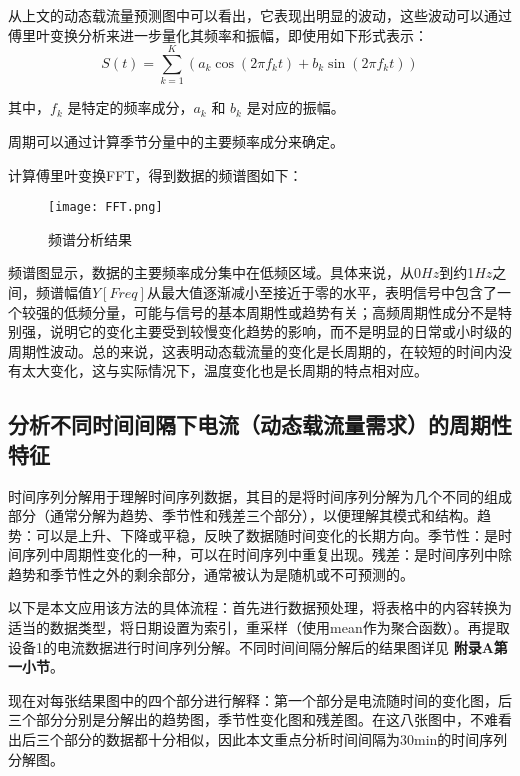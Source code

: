 \documentclass[withoutpreface,bwprint]{cumcmthesis}  %
\begin{document}
        \vspace{12pt}

        从上文的动态载流量预测图中可以看出，它表现出明显的波动，这些波动可以通过傅里叶变换分析来进一步量化其频率和振幅，即使用如下形式表示：
        \begin{equation}
            S(t)=\sum_{k=1}^K\left(a_k \cos \left(2 \pi f_k t\right)+b_k \sin \left(2 \pi f_k t\right)\right)
        \end{equation}

        其中，$f_k$ 是特定的频率成分，$a_k$ 和 $b_k$ 是对应的振幅。
        
        周期可以通过计算季节分量中的主要频率成分来确定。

        计算傅里叶变换FFT，得到数据的频谱图如下：

        \begin{figure}[h!]
		  \centering
		  \texttt{[image: FFT.png]}
		  \caption{频谱分析结果}
	\end{figure}

        频谱图显示，数据的主要频率成分集中在低频区域。具体来说，从0$Hz$到约1$Hz$之间，频谱幅值$Y[Freq]$从最大值逐渐减小至接近于零的水平，表明信号中包含了一个较强的低频分量，可能与信号的基本周期性或趋势有关；高频周期性成分不是特别强，说明它的变化主要受到较慢变化趋势的影响，而不是明显的日常或小时级的周期性波动。总的来说，这表明动态载流量的变化是长周期的，在较短的时间内没有太大变化，这与实际情况下，温度变化也是长周期的特点相对应。


        \subsection {分析不同时间间隔下电流（动态载流量需求）的周期性特征}
        \label{model_1}
        时间序列分解用于理解时间序列数据，其目的是将时间序列分解为几个不同的组成部分（通常分解为趋势、季节性和残差三个部分），以便理解其模式和结构。趋势：可以是上升、下降或平稳，反映了数据随时间变化的长期方向。季节性：是时间序列中周期性变化的一种，可以在时间序列中重复出现。残差：是时间序列中除趋势和季节性之外的剩余部分，通常被认为是随机或不可预测的。

        以下是本文应用该方法的具体流程：首先进行数据预处理，将表格中的内容转换为适当的数据类型，将日期设置为索引，重采样（使用mean作为聚合函数）。再提取设备1的电流数据进行时间序列分解。不同时间间隔分解后的结果图详见
        \textbf{附录A第一小节}。
       
        现在对每张结果图中的四个部分进行解释：第一个部分是电流随时间的变化图，后三个部分分别是分解出的趋势图，季节性变化图和残差图。在这八张图中，不难看出后三个部分的数据都十分相似，因此本文重点分析时间间隔为30min的时间序列分解图。
        
\end{document}
